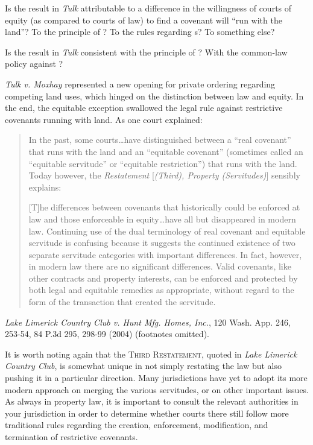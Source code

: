 
\item Is the result in \textit{Tulk} attributable to a difference in the
willingness of courts of equity (as compared to courts of law) to find a
covenant will ``run with the land''? To the principle of
\textit{}? To
the rules regarding s? To something else?


\item Is the result in \textit{Tulk} consistent with the principle of
\textit{}? With the common-law policy against
?

\item \textit{Tulk v. Moxhay} represented a new opening for private ordering
regarding competing land uses, which hinged on the distinction between law and
equity. In the end, the equitable exception swallowed the legal rule against
restrictive covenants running with land. As one court explained:
\begin{quotation}
In the past, some courts\ldots have distinguished between a ``real covenant''
that runs with the land and an ``equitable covenant'' (sometimes called an
``equitable servitude'' or ``equitable restriction'') that runs with the land.
Today however, the \textit{Restatement} [\textit{(Third), Property
(Servitudes)}] sensibly explains:

[T]he differences between covenants that historically could be enforced at law
and those enforceable in equity\ldots have all but disappeared in modern law.
Continuing use of the dual terminology of real covenant and equitable servitude
is confusing because it suggests the continued existence of two separate
servitude categories with important differences. In fact, however, in modern law
there are no significant differences. Valid covenants, like other contracts and
property interests, can be enforced and protected by both legal and equitable
remedies as appropriate, without regard to the form of the transaction that
created the servitude.
\end{quotation}
\emph{Lake Limerick Country Club v. Hunt Mfg. Homes, Inc.}, 120 Wash. App. 246,
253-54, 84 P.3d 295, 298-99 (2004) (footnotes omitted).

\item It is worth noting again that the \textsc{Third Restatement}, quoted in
\textit{Lake Limerick Country Club}, is somewhat unique in not simply restating
the law but also pushing it in a particular direction. Many jurisdictions have
yet to adopt its more modern approach on merging the various servitudes, or on
other important issues. As always in property law, it is important to consult
the relevant authorities in your jurisdiction in order to determine whether
courts there still follow more traditional rules regarding the creation,
enforcement, modification, and termination of restrictive covenants.

